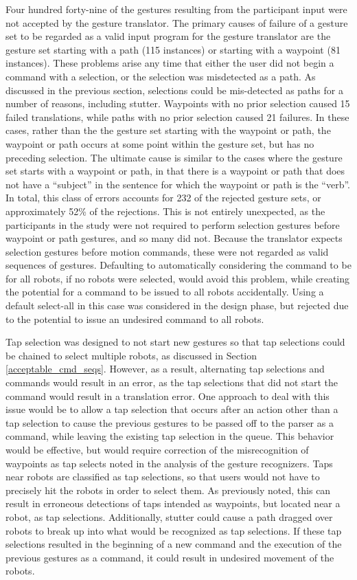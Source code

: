 Four hundred forty-nine of the gestures resulting from the participant input were not accepted by the gesture translator. 
The primary causes of failure of a gesture set to be regarded as a valid input program for the gesture translator are the gesture set starting with a path (115 instances) or starting with a waypoint (81 instances). 
These problems arise any time that either the user did not begin a command with a selection, or the selection was misdetected as a path. 
As discussed in the previous section, selections could be mis-detected as paths for a number of reasons, including stutter. 
Waypoints with no prior selection caused 15 failed translations, while paths with no prior selection caused 21 failures. 
In these cases, rather than the the gesture set starting with the waypoint or path, the waypoint or path occurs at some point within the gesture set, but has no preceding selection. 
The ultimate cause is similar to the cases where the gesture set starts with a waypoint or path, in that there is a waypoint or path that does not have a ``subject'' in the sentence for which the waypoint or path is the ``verb''.
In total, this class of errors accounts for 232 of the rejected gesture sets, or approximately 52\% of the rejections. 
This is not entirely unexpected, as the participants in the study were not required to perform selection gestures before waypoint or path gestures, and so many did not.
Because the translator expects selection gestures before motion commands, these were not regarded as valid sequences of gestures. 
Defaulting to automatically considering the command to be for all robots, if no robots were selected, would avoid this problem, while creating the potential for a command to be issued to all robots accidentally. 
Using a default select-all in this case was considered in the design phase, but rejected due to the potential to issue an undesired command to all robots. 

Tap selection was designed to not start new gestures so that tap selections could be chained to select multiple robots, as discussed in Section \ref{acceptable_cmd_seqs}.
However, as a result, alternating tap selections and commands would result in an error, as the tap selections that did not start the command would result in a translation error.
One approach to deal with this issue would be to allow a tap selection that occurs after an action other than a tap selection to cause the previous gestures to be passed off to the parser as a command, while leaving the existing tap selection in the queue. 
This behavior would be effective, but would require correction of the misrecognition of waypoints as tap selects noted in the analysis of the gesture recognizers.
Taps near robots are classified as tap selections, so that users would not have to precisely hit the robots in order to select them. 
As previously noted, this can result in erroneous detections of taps intended as waypoints, but located near a robot, as tap selections. 
Additionally, stutter could cause a path dragged over robots to break up into what would be recognized as tap selections. 
If these tap selections resulted in the beginning of a new command and the execution of the previous gestures as a command, it could result in undesired movement of the robots. 

